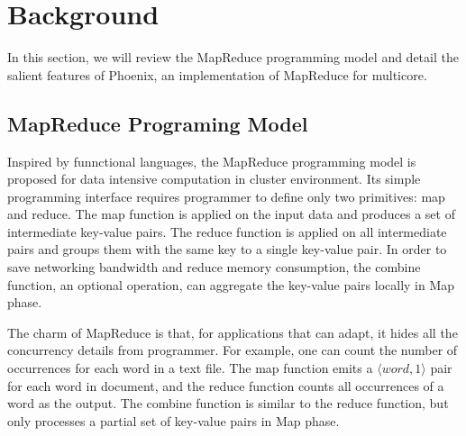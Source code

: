 \section{Background}
\label{sec:back}
In this section, we will review the MapReduce programming
model and detail the salient features of Phoenix, 
an implementation of MapReduce for multicore.

\subsection{MapReduce Programing Model}
Inspired  by funnctional languages, the MapReduce programming model is proposed for data intensive computation in cluster environment.
Its simple programming interface requires programmer to  define only two primitives: map and reduce.
The map function is applied on the input data and produces a set of intermediate key-value pairs.
The reduce function is applied on all intermediate pairs and  groups them with the same key to a single key-value pair. 
In order to save networking bandwidth and reduce memory consumption, the combine function, an optional operation, can aggregate the key-value pairs locally in Map phase.


The charm of MapReduce is that, for applications that can adapt, it hides all the concurrency details from  programmer. 
For example, one can count the number of occurrences for each word in a text file. 
The map function emits a $\langle word, 1\rangle$ pair for each word in document, and the reduce function counts all occurrences of a word as the output. 
The combine function is similar to the reduce function, but only processes a partial set of key-value pairs in Map phase.


